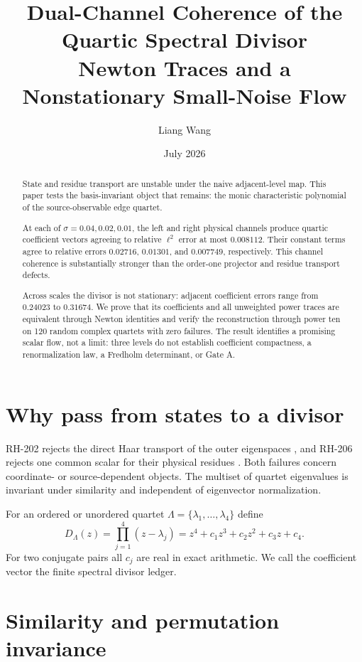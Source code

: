 \documentclass[12pt]{article}
\title{Dual-Channel Coherence of the Quartic Spectral Divisor\\
\large Newton Traces and a Nonstationary Small-Noise Flow}
\author{Liang Wang}\date{July 2026}
\theoremstyle{remark}\newtheorem{remark}[theorem]{Remark}
\begin{document}
\maketitle
\begin{abstract}
State and residue transport are unstable under the naive adjacent-level map.
This paper tests the basis-invariant object that remains: the monic
characteristic polynomial of the source-observable edge quartet.

At each of $\sigma=0.04,0.02,0.01$, the left and right physical channels
produce quartic coefficient vectors agreeing to relative $\ell^2$ error at
most $0.008112$.  Their constant terms agree to relative errors
$0.02716$, $0.01301$, and $0.007749$, respectively.  This channel coherence
is substantially stronger than the order-one projector and residue
transport defects.

Across scales the divisor is not stationary: adjacent coefficient errors
range from $0.24023$ to $0.31674$.  We prove that its coefficients and all
unweighted power traces are equivalent through Newton identities and verify
the reconstruction through power ten on 120 random complex quartets with
zero failures.  The result identifies a promising scalar flow, not a limit:
three levels do not establish coefficient compactness, a renormalization
law, a Fredholm determinant, or Gate A.
\end{abstract}

\section{Why pass from states to a divisor}

RH-202 rejects the direct Haar transport of the outer eigenspaces
\citep{WangRH202}, and RH-206 rejects one common scalar for their physical
residues \citep{WangRH206}.  Both failures concern coordinate- or
source-dependent objects.  The multiset of quartet eigenvalues is invariant
under similarity and independent of eigenvector normalization.

For an ordered or unordered quartet $\Lambda=\{\lambda_1,\ldots,\lambda_4\}$
define
\begin{equation}\label{eq:divisor}
 D_\Lambda(z)=\prod_{j=1}^4(z-\lambda_j)
 =z^4+c_1z^3+c_2z^2+c_3z+c_4.
\end{equation}
For two conjugate pairs all $c_j$ are real in exact arithmetic.  We call the
coefficient vector the finite spectral divisor ledger.

\section{Similarity and permutation invariance}
\end{document}
